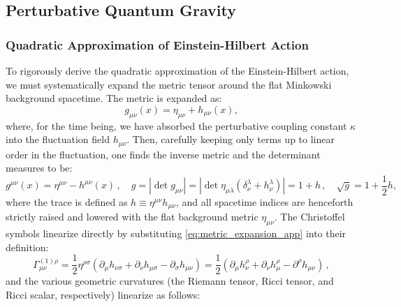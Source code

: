 \newpage
\subsection*{Perturbative Quantum Gravity} \label{app:perturbative_gravity}

\subsubsection{Quadratic Approximation of Einstein-Hilbert Action}

To rigorously derive the quadratic approximation of the Einstein-Hilbert action, we must systematically expand the metric tensor around the flat Minkowski background spacetime. The metric is expanded as:
\begin{equation} \label{eq:metric_expansion_app}
    g_{\mu\nu}(x) = \eta_{\mu\nu} + h_{\mu\nu}(x),
\end{equation}
where, for the time being, we have absorbed the perturbative coupling constant \(\kappa\) into the fluctuation field \(h_{\mu\nu}\). Then, carefully keeping only terms up to linear order in the fluctuation, one finds the inverse metric and the determinant measures to be:
\[
    g^{\mu\nu}(x) = \eta^{\mu\nu} - h^{\mu\nu}(x) \, , \quad g = |\det g_{\mu\nu}| = |\det \eta_{\mu\lambda}(\delta^\lambda_\nu + h^\lambda_\nu)| = 1 + h \, , \quad \sqrt{g} = 1 + \frac{1}{2}h,
\]
where the trace is defined as \(h \equiv \eta^{\mu\nu}h_{\mu\nu}\), and all spacetime indices are henceforth strictly raised and lowered with the flat background metric \(\eta_{\mu\nu}\). The Christoffel symbols linearize directly by substituting \eqref{eq:metric_expansion_app} into their definition:
\begin{equation} \label{eq:linear_christoffel}
    \Gamma^{(1)\rho}_{\mu\nu} = \frac{1}{2}\eta^{\rho\sigma}(\partial_\mu h_{\nu\sigma} + \partial_\nu h_{\mu\sigma} - \partial_\sigma h_{\mu\nu}) = \frac{1}{2}(\partial_\mu h_\nu^\rho + \partial_\nu h_\mu^\rho - \partial^\rho h_{\mu\nu}) \, ,
\end{equation}
and the various geometric curvatures (the Riemann tensor, Ricci tensor, and Ricci scalar, respectively) linearize as follows:
